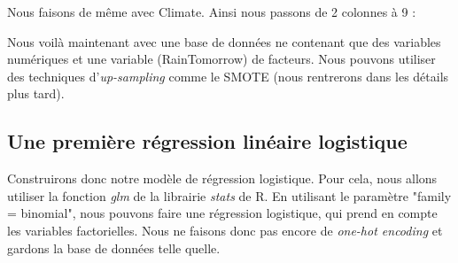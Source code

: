 \documentclass{article}
\begin{document}
Nous faisons de même avec Climate. Ainsi nous passons de 2 colonnes à 9 : 

\begin{table}[ht]
    \centering
    \caption{Extrait du début des variables après \emph{one-hot encoding} des variables Season et Climate.}
\end{table}

Nous voilà maintenant avec une base de données ne contenant que des variables numériques et une variable (RainTomorrow) de facteurs. Nous pouvons utiliser des techniques d'\emph{up-sampling} comme le SMOTE (nous rentrerons dans les détails plus tard).

\subsection{Une première régression linéaire logistique}

Construirons donc notre modèle de régression logistique. Pour cela, nous allons utiliser la fonction \emph{glm} de la librairie \emph{stats} de R. En utilisant le paramètre "family = binomial", nous pouvons faire une régression logistique, qui prend en compte les variables factorielles. Nous ne faisons donc pas encore de \emph{one-hot encoding} et gardons la base de données telle quelle. 
\end{document}
